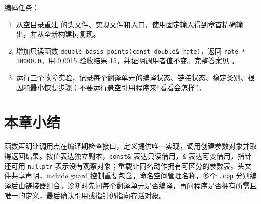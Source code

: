 编码任务：

\begin{enumerate}
  \item 从空目录重建  的头文件、实现文件和入口，使用固定输入得到章首精确输出，并从全新构建树复现。
  \item 增加只读函数 \texttt{double basis\_points(const double\& rate)}，返回 \texttt{rate * 10000.0}。用 0.0015 验收结果 15，并证明调用者值不变。完整答案见 。
  \item 运行三个故障实验，记录每个翻译单元的编译状态、链接状态、稳定类别、根因和最小恢复步骤；不要运行悬空引用程序来“看看会怎样”。
\end{enumerate}


\section{本章小结}

函数声明让调用点在编译期检查接口，定义提供唯一实现，调用创建参数对象并取得返回结果。按值表达独立副本，\texttt{const\&} 表达只读借用，\texttt{\&} 表达可变借用，指针还可用 \texttt{nullptr} 表示没有观察对象；重载让同名动作拥有可区分的参数表。头文件共享声明，include guard 控制重复包含，命名空间管理名称，多个 \texttt{.cpp} 分别编译后由链接器组合。诊断时先问每个翻译单元是否编译，再问程序是否拥有所需且唯一的定义，最后确认引用或指针仍指向存活对象。
